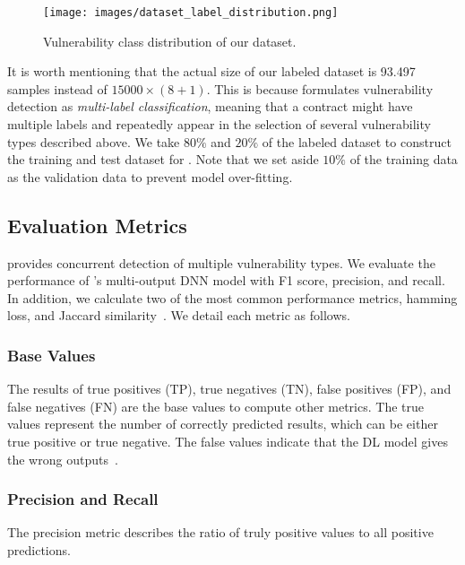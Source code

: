 \begin{figure}[ht!]
\centering
\texttt{[image: images/dataset\_label\_distribution.png]}
\vspace{-1em}
\caption{Vulnerability class distribution of our dataset. 
}
\label{fig:dataset-distribution}
\vspace{0.7em}
\end{figure}
    
It is worth mentioning that the actual size of our labeled dataset is 93.497 samples instead of $15000 \times (8+1)$. This is because \sys{} formulates vulnerability detection as \textit{multi-label classification}, meaning that a contract might have multiple labels and repeatedly appear in the selection of several vulnerability types described above.
We take $80\%$ and $20\%$ of the labeled dataset to construct the training and test dataset for \sys{}. Note that we set aside $10\%$ of the training data as the validation data to prevent model over-fitting.

\subsection{Evaluation Metrics}
\label{sec:evaluation:metrics}
\vspace{-0.2em}
\sys{} provides concurrent detection of multiple vulnerability types. We evaluate the performance of \sys{}'s multi-output DNN model with F1 score, precision, and recall. 
In addition, we calculate two of the most common performance metrics, hamming loss, and Jaccard similarity~\cite{book:MML}.  
We detail each metric as follows. 

\subsubsection{Base Values}
The results of true positives (TP), true negatives (TN), false positives (FP), and false negatives (FN) are the base values to compute other metrics. 
The true values represent the number of correctly predicted results, which can be either true positive or true negative. 
The false values indicate that the DL model gives the wrong outputs~\cite{deep-learning-glossary}. 

\vspace{0.1em}
\subsubsection{Precision and Recall}
The precision metric describes the ratio of truly positive values to all positive predictions. 

